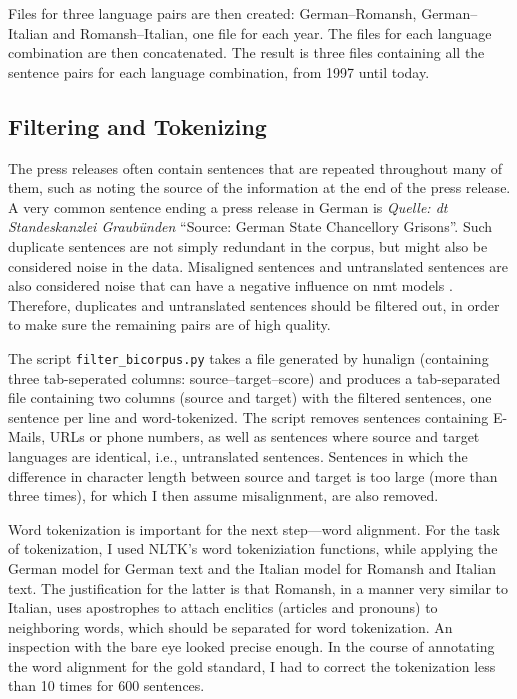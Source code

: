 Files for three language pairs are  then created: German--Romansh, German--Italian and Romansh--Italian, one file for each year. 
The files for each language combination are then concatenated.
The result is three files containing all the sentence pairs for each language combination, from 1997 until today.

\subsection{Filtering and Tokenizing}
The press releases often contain sentences that are repeated throughout many of them, such as noting the source of the information at the end of the press release. 
A very common sentence ending a press release in German is \emph{Quelle: dt Standeskanzlei Graubünden} \enquote{Source: German State Chancellory Grisons}. 
Such duplicate sentences are not simply redundant in the corpus, but might also be considered noise in the data. %
Misaligned sentences and untranslated sentences are also considered noise that can have a negative influence on \acrshort{nmt} models \autocite{khayrallah-koehn-2018-impact}.
Therefore, duplicates and untranslated sentences should be filtered out, in order to make sure the remaining pairs are of high quality.

The script \texttt{filter\_bicorpus.py} takes a file generated by hunalign (containing three tab-seperated columns: source--target--score) and produces a tab-separated file containing two columns (source and target) with the filtered sentences, one sentence per line and word-tokenized. 
The script removes sentences containing E-Mails, \acrshort{URL}s or phone numbers, as well as sentences where source and target languages are identical, i.e., untranslated sentences. Sentences in which the difference in character length  between source and target is too large (more than three times), for which I then assume misalignment, are also removed.

Word tokenization is important for the next step---word alignment. 
For the task of tokenization, I used NLTK's \autocite{bird-2009-nltk} word tokeniziation functions, while applying the German model for German text and the Italian model for Romansh and Italian text. 
The justification for the latter is that Romansh, in a manner very similar to Italian, uses apostrophes to attach enclitics (articles and pronouns) to neighboring words, which should be separated for word tokenization. 
An inspection with the bare eye looked precise enough. 
In the course of annotating the word alignment for the gold standard, I had to correct the tokenization less than 10 times for 600 sentences.


